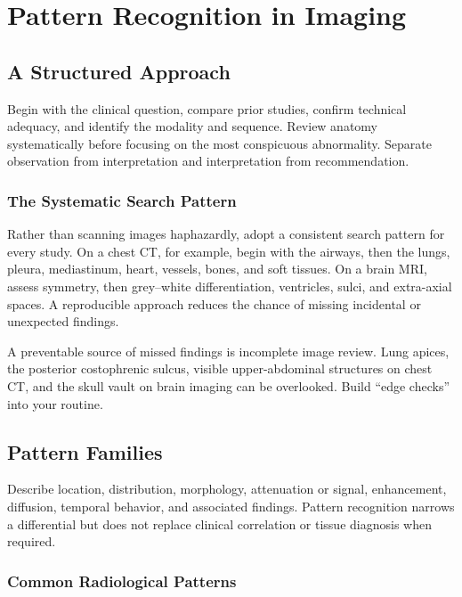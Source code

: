 \chapter{Pattern Recognition in Imaging}

\label{ch:ch29_pattern_recognition}

\section{A Structured Approach}
Begin with the clinical question, compare prior studies, confirm technical adequacy, and identify the modality and sequence. Review anatomy systematically before focusing on the most conspicuous abnormality. Separate observation from interpretation and interpretation from recommendation.

\subsection{The Systematic Search Pattern}
Rather than scanning images haphazardly, adopt a consistent search pattern for every study. On a chest CT, for example, begin with the airways, then the lungs, pleura, mediastinum, heart, vessels, bones, and soft tissues. On a brain MRI, assess symmetry, then grey--white differentiation, ventricles, sulci, and extra-axial spaces. A reproducible approach reduces the chance of missing incidental or unexpected findings.

\begin{pearlbox}
A preventable source of missed findings is incomplete image review. Lung apices, the posterior costophrenic sulcus, visible upper-abdominal structures on chest CT, and the skull vault on brain imaging can be overlooked. Build ``edge checks'' into your routine.
\end{pearlbox}

\section{Pattern Families}
Describe location, distribution, morphology, attenuation or signal, enhancement, diffusion, temporal behavior, and associated findings. Pattern recognition narrows a differential but does not replace clinical correlation or tissue diagnosis when required.

\subsection{Common Radiological Patterns}

